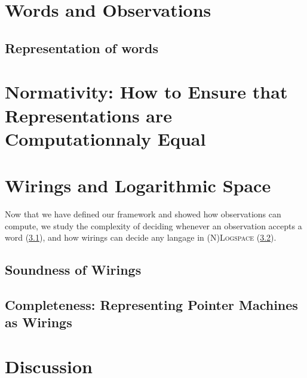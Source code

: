 \section{Words and Observations}\label{sec_words}
	\subsection{Representation of words}
	
	
	
\section{Normativity: How to Ensure that Representations are Computationnaly Equal}\label{sec_normativity}
	

\section{Wirings and Logarithmic Space}\label{sec_logspace}
	Now that we have defined our framework and showed how observations can compute, we study the complexity of deciding whenever an observation accepts a word (\ref{subsec_soundness}), and how wirings can decide any langage in \textsc{(N)Logspace} (\ref{subsec_completness}).
	\subsection{Soundness of Wirings}
	\label{subsec_soundness}
	
	\subsection{Completeness: Representing Pointer Machines as Wirings}
	\label{subsec_completness}
	

\section*{Discussion}





